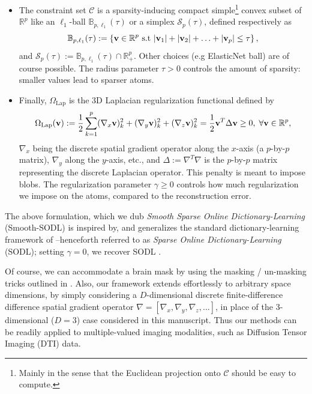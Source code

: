 \begin{itemize}
\item The constraint set $\mathcal C$ is a sparsity-inducing compact
simple\footnote{Mainly in the sense that the Euclidean projection onto
$\mathcal C$ should be easy to compute.} convex subset of $\mathbb R^p$
like an $\ell_1$-ball $\mathbb B_{p,\ell_1}(\tau)$ or a simplex $\mathcal S_p(\tau)$, defined respectively as $$\mathbb B_{p,\ell_1}(\tau) := \left\{\mathbf{v} \in \mathbb R^p\text{ s.t }|\mathbf{v}_1| + |\mathbf{v}_2| + \ldots + |\mathbf{v}_p| \le \tau\right\},$$
and
$\mathcal S_p(\tau) := \mathbb B_{p,\ell_1}(\tau) \cap \mathbb R_+^p.$
Other choices (e.g ElasticNet ball) are of course possible. The radius parameter $\tau > 0$ controls the
amount of sparsity: smaller values lead to sparser atoms.
\item  Finally, $\Omega_{\text{Lap}}$ is the 3D Laplacian regularization functional
defined by
\begin{eqnarray}
\label{eq:sob}
\Omega_{\text{Lap}}(\mathbf{v}) := \frac{1}{2}\sum_{k=1}^p(\nabla_x \mathbf{v})_k^2 + (\nabla_y
\mathbf{v})_k^2 + (\nabla_z \mathbf{v})_k^2 =  \frac{1}{2}{\mathbf{v}}^T\Delta \mathbf{v} \ge 0,\;
\forall \mathbf{v} \in \mathbb R^p,
\end{eqnarray}
$\nabla_x$ being the discrete spatial gradient operator
along the $x$-axis (a $p$-by-$p$ matrix), $\nabla_y$ along the $y$-axis,
etc., and $\Delta :=
\nabla^T\nabla$ is the $p$-by-$p$ matrix representing the discrete
Laplacian operator. This penalty is meant to impose blobs.
The regularization parameter $\gamma \ge 0$ controls
how much regularization we impose on the atoms, compared to the
reconstruction error.

\end{itemize}
The above formulation, which we dub \textit{Smooth Sparse Online Dictionary-Learning} (Smooth-SODL) is inspired by, and generalizes the standard
dictionary-learning framework of  \cite{mairal2010} --henceforth referred to as \textit{Sparse Online Dictionary-Learning} (SODL); setting $\gamma = 0$, we recover SODL  \cite{mairal2010}.

\begin{remark}
Of course, we can accommodate a brain mask by using the masking / un-masking tricks outlined in  \cite{michel2011tv}.  
Also, our framework extends effortlessly to arbitrary space
dimensions, by simply considering a $D$-dimensional discrete
finite-difference difference spatial gradient operator $\nabla =
[\nabla_x, \nabla_y, \nabla_z,\ldots]$, in place of the 3-dimensional ($D=3$) case considered in this manuscript. Thus our methods
can be readily applied to multiple-valued imaging modalities, such as Diffusion Tensor Imaging (DTI) data.
\end{remark}

